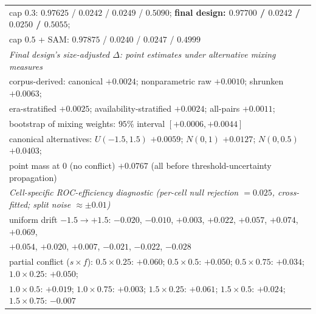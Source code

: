 \documentclass[11pt]{article}
\begin{document}
\begin{table}[htbp]
\begin{tabular}{lcccc}
\multicolumn{5}{l}{cap $0.3$: $0.97625$ / $0.0242$ / $0.0249$ / $0.5090$;
\quad \textbf{final design: $0.97700$ / $0.0242$ / $0.0250$ /
$0.5055$};}\\
\multicolumn{5}{l}{cap $0.5$ + SAM: $0.97875$ / $0.0240$ / $0.0247$ /
$0.4999$}\\
\hline
\multicolumn{5}{l}{\emph{Final design's size-adjusted $\Delta$: point
estimates under alternative mixing measures}}\\
\multicolumn{5}{l}{corpus-derived: canonical $+0.0024$; nonparametric raw
$+0.0010$; shrunken $+0.0063$;}\\
\multicolumn{5}{l}{\quad era-stratified $+0.0025$; availability-stratified
$+0.0024$; all-pairs $+0.0011$;}\\
\multicolumn{5}{l}{\quad bootstrap of mixing weights: $95\%$ interval
$[+0.0006, +0.0044]$}\\
\multicolumn{5}{l}{canonical alternatives: $U(-1.5,1.5)$ $+0.0059$;
$N(0,1)$ $+0.0127$; $N(0,0.5)$ $+0.0403$;}\\
\multicolumn{5}{l}{\quad point mass at $0$ (no conflict) $+0.0767$
\quad (all before threshold-uncertainty propagation)}\\
\hline
\multicolumn{5}{l}{\emph{Cell-specific ROC-efficiency diagnostic
(per-cell null rejection $=0.025$, cross-fitted; split noise
$\approx\pm0.01$)}}\\
\multicolumn{5}{l}{uniform drift $-1.5\to+1.5$: $-0.020$, $-0.010$,
$+0.003$, $+0.022$, $+0.057$, $+0.074$, $+0.069$,}\\
\multicolumn{5}{l}{\quad $+0.054$, $+0.020$, $+0.007$, $-0.021$,
$-0.022$, $-0.028$}\\
\multicolumn{5}{l}{partial conflict ($s \times f$): $0.5{\times}0.25$:
$+0.060$; $0.5{\times}0.5$: $+0.050$; $0.5{\times}0.75$: $+0.034$;
$1.0{\times}0.25$: $+0.050$;}\\
\multicolumn{5}{l}{\quad $1.0{\times}0.5$: $+0.019$; $1.0{\times}0.75$:
$+0.003$; $1.5{\times}0.25$: $+0.061$; $1.5{\times}0.5$: $+0.024$;
$1.5{\times}0.75$: $-0.007$}\\
\hline
\end{tabular}
\end{table}
\end{document}
